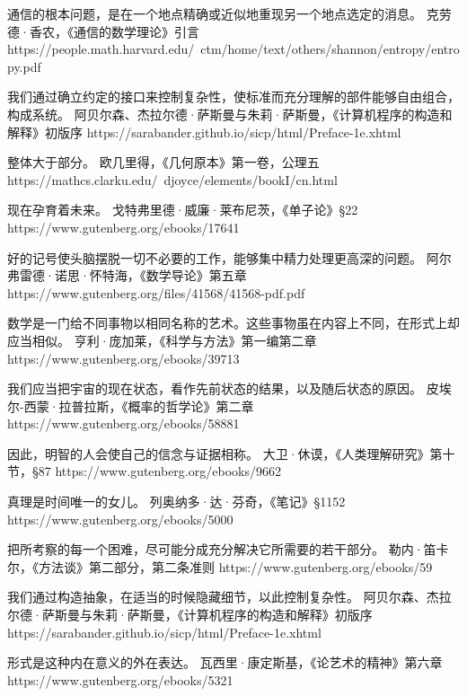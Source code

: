 %
  {通信的根本问题，是在一个地点精确或近似地重现另一个地点选定的消息。}%
  {克劳德·香农，《通信的数学理论》引言}%
  {https://people.math.harvard.edu/~ctm/home/text/others/shannon/entropy/entropy.pdf}

%
  {我们通过确立约定的接口来控制复杂性，使标准而充分理解的部件能够自由组合，构成系统。}%
  {阿贝尔森、杰拉尔德·萨斯曼与朱莉·萨斯曼，《计算机程序的构造和解释》初版序}%
  {https://sarabander.github.io/sicp/html/Preface-1e.xhtml}

%
  {整体大于部分。}%
  {欧几里得，《几何原本》第一卷，公理五}%
  {https://mathcs.clarku.edu/~djoyce/elements/bookI/cn.html}

%
  {现在孕育着未来。}%
  {戈特弗里德·威廉·莱布尼茨，《单子论》§22}%
  {https://www.gutenberg.org/ebooks/17641}

%
  {好的记号使头脑摆脱一切不必要的工作，能够集中精力处理更高深的问题。}%
  {阿尔弗雷德·诺思·怀特海，《数学导论》第五章}%
  {https://www.gutenberg.org/files/41568/41568-pdf.pdf}

%
  {数学是一门给不同事物以相同名称的艺术。这些事物虽在内容上不同，在形式上却应当相似。}%
  {亨利·庞加莱，《科学与方法》第一编第二章}%
  {https://www.gutenberg.org/ebooks/39713}

%
  {我们应当把宇宙的现在状态，看作先前状态的结果，以及随后状态的原因。}%
  {皮埃尔-西蒙·拉普拉斯，《概率的哲学论》第二章}%
  {https://www.gutenberg.org/ebooks/58881}

%
  {因此，明智的人会使自己的信念与证据相称。}%
  {大卫·休谟，《人类理解研究》第十节，§87}%
  {https://www.gutenberg.org/ebooks/9662}

%
  {真理是时间唯一的女儿。}%
  {列奥纳多·达·芬奇，《笔记》§1152}%
  {https://www.gutenberg.org/ebooks/5000}

%
  {把所考察的每一个困难，尽可能分成充分解决它所需要的若干部分。}%
  {勒内·笛卡尔，《方法谈》第二部分，第二条准则}%
  {https://www.gutenberg.org/ebooks/59}

%
  {我们通过构造抽象，在适当的时候隐藏细节，以此控制复杂性。}%
  {阿贝尔森、杰拉尔德·萨斯曼与朱莉·萨斯曼，《计算机程序的构造和解释》初版序}%
  {https://sarabander.github.io/sicp/html/Preface-1e.xhtml}

%
  {形式是这种内在意义的外在表达。}%
  {瓦西里·康定斯基，《论艺术的精神》第六章}%
  {https://www.gutenberg.org/ebooks/5321}

